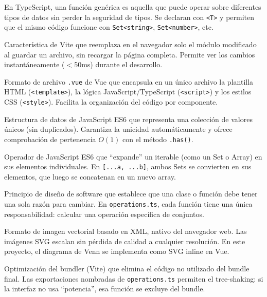\documentclass[11pt,a4paper]{article}
\begin{document}
\begin{description}[leftmargin=1.5cm, style=nextline]
    \item[\textbf{Generic / Genérica (función genérica):}] En TypeScript, una función genérica es aquella que puede operar sobre diferentes tipos de datos sin perder la seguridad de tipos. Se declaran con \texttt{<T>} y permiten que el mismo código funcione con \texttt{Set<string>}, \texttt{Set<number>}, etc.
    
    \item[\textbf{HMR (Hot Module Replacement):}] Característica de Vite que reemplaza en el navegador solo el módulo modificado al guardar un archivo, sin recargar la página completa. Permite ver los cambios instantáneamente ($<$50ms) durante el desarrollo.
    
    \item[\textbf{SFC (Single File Component):}] Formato de archivo \texttt{.vue} de Vue que encapsula en un único archivo la plantilla HTML (\texttt{<template>}), la lógica JavaScript/TypeScript (\texttt{<script>}) y los estilos CSS (\texttt{<style>}). Facilita la organización del código por componente.
    
    \item[\textbf{Set (tipo de dato):}] Estructura de datos de JavaScript ES6 que representa una colección de valores únicos (sin duplicados). Garantiza la unicidad automáticamente y ofrece comprobación de pertenencia $O(1)$ con el método \texttt{.has()}.
    
    \item[\textbf{Spread operator (\dots):}] Operador de JavaScript ES6 que ``expande'' un iterable (como un Set o Array) en sus elementos individuales. En \texttt{[...a, ...b]}, ambos Sets se convierten en sus elementos, que luego se concatenan en un nuevo array.
    
    \item[\textbf{SRP (Single Responsibility Principle):}] Principio de diseño de software que establece que una clase o función debe tener una sola razón para cambiar. En \texttt{operations.ts}, cada función tiene una única responsabilidad: calcular una operación específica de conjuntos.
    
    \item[\textbf{SVG (Scalable Vector Graphics):}] Formato de imagen vectorial basado en XML, nativo del navegador web. Las imágenes SVG escalan sin pérdida de calidad a cualquier resolución. En este proyecto, el diagrama de Venn se implementa como SVG inline en Vue.
    
    \item[\textbf{Tree-shaking:}] Optimización del bundler (Vite) que elimina el código no utilizado del bundle final. Las exportaciones nombradas de \texttt{operations.ts} permiten el tree-shaking: si la interfaz no usa ``potencia'', esa función se excluye del bundle.
    

\end{description}
\end{document}
